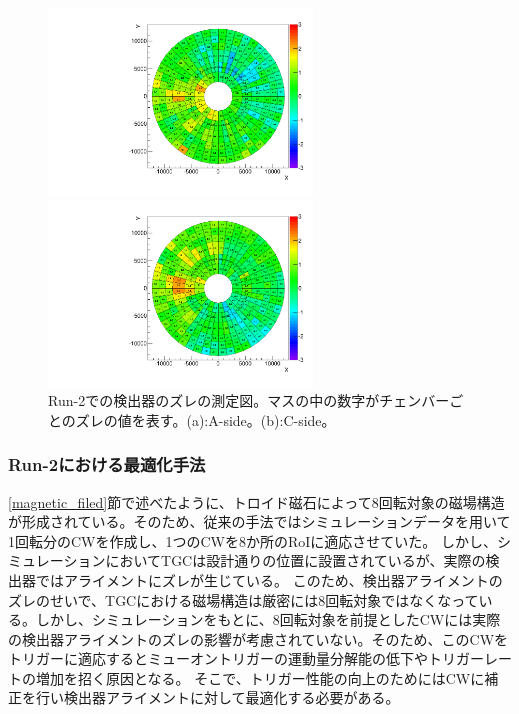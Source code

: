 \begin{figure}
    \begin{minipage}[tb]{0.4\linewidth}
        \hspace*{-1cm}
        \centering
        \includegraphics[clip, width=7cm]{fig/3/TGCAlign_CW.muon.bias.20160606.v1.A-side.pdf}
        \subcaption{}
    \end{minipage}
    \hfill
    \begin{minipage}[tb]{0.4\linewidth}
        \centering
        \hspace*{-1cm}
        \includegraphics[clip, width=7cm]{fig/3/TGCAlign_CW.muon.bias.20160606.v1.C-side.pdf}
        \subcaption{}
    \end{minipage}
    \caption{Run-2での検出器のズレの測定図。マスの中の数字がチェンバーごとのズレの値を表す。(a):A-side。(b):C-side。}
    \label{fig:ズレ}
\end{figure}


\subsubsection{Run-2における最適化手法}
\ref{magnetic_filed}節で述べたように、トロイド磁石によって8回転対象の磁場構造が形成されている。そのため、従来の手法ではシミュレーションデータを用いて1回転分のCWを作成し、1つのCWを8か所のRoIに適応させていた。
しかし、シミュレーションにおいてTGCは設計通りの位置に設置されているが、実際の検出器ではアライメントにズレが生じている。
このため、検出器アライメントのズレのせいで、TGCにおける磁場構造は厳密には8回転対象ではなくなっている。しかし、シミュレーションをもとに、8回転対象を前提としたCWには実際の検出器アライメントのズレの影響が考慮されていない。そのため、このCWをトリガーに適応するとミューオントリガーの運動量分解能の低下やトリガーレートの増加を招く原因となる。
そこで、トリガー性能の向上のためにはCWに補正を行い検出器アライメントに対して最適化する必要がある。

